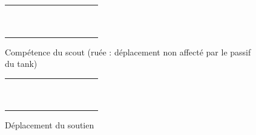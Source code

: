 \documentclass[a4paper]{scrreprt}
\begin{document}
\begin{figure}
    \centering
    \begin{tabular}{|c|c|c|c|c|c|c|c|c|c|c|}
        \hline
        &&&&&&&&&&\\ \hline  
        &&&&&&&&&&\\ \hline 
        &&&&&&&&&&\\ \hline 
        &&&&&&&&&&\\ \hline 
        &&&&&\cellcolor{cgreen}&&&&&\\ \hline 
        &&&&\cellcolor{cgreen}&\cellcolor{yellow}&\cellcolor{cgreen}&&&&\\ \hline 
        &&&&&\cellcolor{cgreen}&&&&&\\ \hline 
        &&&&&&&&&&\\ \hline 
        &&&&&&&&&&\\ \hline 
        &&&&&&&&&&\\ \hline 
        &&&&&&&&&&\\ \hline
    
    \end{tabular}
    \caption{Compétence du scout (ruée : déplacement non affecté par le passif du tank)}
    \label{fig:scoutcomp}
\end{figure}

\begin{figure}
    \centering
    \begin{tabular}{|c|c|c|c|c|c|c|c|c|c|c|}
        \hline
        &&&&&&&&&&\\ \hline  
        &&&&&&&&&&\\ \hline 
        &&&&&&&&&&\\ \hline
        &&&&\cellcolor{cblue}&&\cellcolor{cblue}&&&&\\ \hline
        &&&\cellcolor{cblue}&&&&\cellcolor{cblue}&&&\\ \hline
        &&&&&\cellcolor{yellow}&&&&&\\ \hline
        &&&\cellcolor{cblue}&&&&\cellcolor{cblue}&&&\\ \hline
        &&&&\cellcolor{cblue}&&\cellcolor{cblue}&&&&\\ \hline
        &&&&&&&&&&\\ \hline
        &&&&&&&&&&\\ \hline
        &&&&&&&&&&\\ \hline
        
    \end{tabular}
    \caption{Déplacement du soutien}
    \label{fig:soutiendep}
\end{figure}
\end{document}

